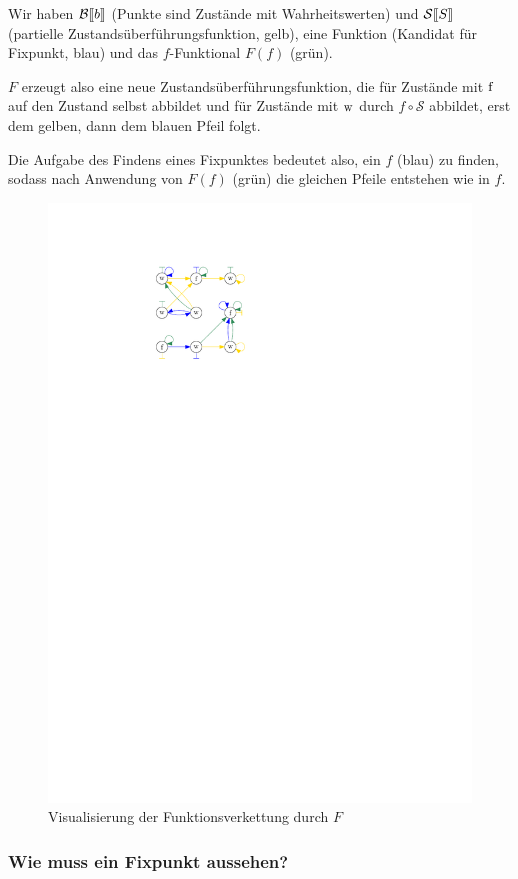 Wir haben $\mathcal{B}\mathrm{[}\kern-.14em\mathrm{[} b\mathrm{]}\kern-.14em\mathrm{]}$ (Punkte sind Zustände mit Wahrheitswerten) und $\mathcal{S}\mathrm{[}\kern-.14em\mathrm{[} S\mathrm{]}\kern-.14em\mathrm{]}$ (partielle Zustandsüberführungsfunktion, gelb), eine Funktion (Kandidat für Fixpunkt, blau) und das $f$-Funktional $F(f)$ (grün).

$F$ erzeugt also eine neue Zustandsüberführungsfunktion, die für Zustände mit $\operatorname{f}$ auf den Zustand selbst abbildet und für Zustände mit $\operatorname{w}$ durch $f \circ \mathcal{S}$ abbildet, \dh{} erst dem gelben, dann dem blauen Pfeil folgt.

Die Aufgabe des Findens eines Fixpunktes bedeutet also, ein $f$ (blau) zu finden, sodass nach Anwendung von $F(f)$ (grün) die gleichen Pfeile entstehen wie in $f$.
\begin{figure}[H]
    \centering
    \includegraphics[page=1,width=.4\textwidth]{img/f-combined}
    \caption{Visualisierung der Funktionsverkettung durch $F$}
\end{figure}



\subsubsection{Wie muss ein Fixpunkt aussehen?}

